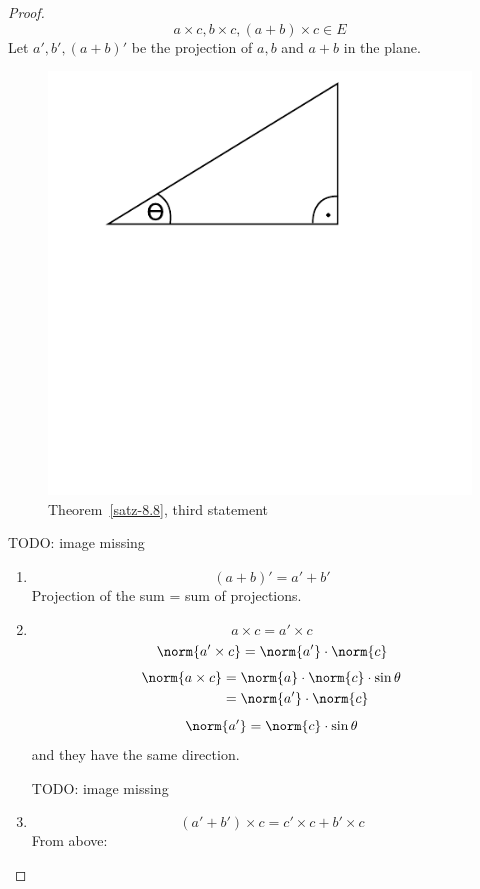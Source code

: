 \documentclass[a4paper,landscape,twocolumn]{article}
\DeclarePairedDelimiter\norm\lVert\rVert
\begin{document}
\begin{proof}
  \[ a \times c, b \times c, (a + b) \times c \in E \]
  Let $a',b',(a+b)'$ be the projection of $a, b$ and $a+b$ in the plane.
  \begin{figure}
    \begin{center}
      \includegraphics{img/8_3_3.pdf} %
      \caption{Theorem~\ref{satz-8.8}, third statement}
    \end{center}
  \end{figure}

  TODO: image missing
  \begin{enumerate}
    \item
      \[ (a + b)' = a' + b' \]
      Projection of the sum = sum of projections.
    \item
      \[ a \times c = a' \times c \]
      \[ \norm{a' \times c} = \norm{a'} \cdot \norm{c} \]
      \begin{align*}
          \norm{a \times c} &= \norm{a} \cdot \norm{c} \cdot \sin{\theta} \\
            &= \norm{a'} \cdot \norm{c}
      \end{align*}
      \[ \norm{a'} = \norm{c} \cdot \sin\theta \]
      and they have the same direction.

      TODO: image missing
    \item
      \[ (a' + b') \times c = c' \times c + b' \times c \]
      From above:


\end{enumerate}
\end{proof}
\end{document}
